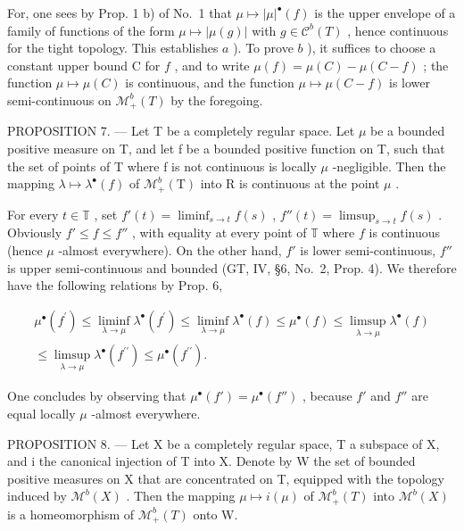 For, one sees by Prop. 1 b) of No.~1 that \(\mu \mapsto |\mu|^{\bullet}(f)\) is the upper envelope of a family of functions of the form \(\mu \mapsto |\mu(g)|\) with \(g \in \mathcal{C}^b(T)\) , hence continuous for the tight topology. This establishes \(a\) ). To prove \(b\) ), it suffices to choose a constant upper bound C for \(f\) , and to write \(\mu(f) = \mu(C) - \mu(C - f)\) ; the function \(\mu \mapsto \mu(C)\) is continuous, and the function \(\mu \mapsto \mu(C - f)\) is lower semi-continuous on \(\mathcal{M}_+^b(T)\) by the foregoing.

PROPOSITION 7. --- Let T be a completely regular space. Let \(\mu\) be a bounded positive measure on T, and let f be a bounded positive function on T, such that the set of points of T where f is not continuous is locally \(\mu\) -negligible. Then the mapping \(\lambda \mapsto \lambda^{\bullet}(f)\) of \(\mathcal{M}_{+}^{b}(\mathrm{T})\) into R is continuous at the point \(\mu\) .

For every \(t \in \mathbb{T}\) , set \(f'(t) = \liminf_{s \to t} f(s)\) , \(f''(t) = \limsup_{s \to t} f(s)\) . Obviously \(f' \leqslant f \leqslant f''\) , with equality at every point of \(\mathbb{T}\) where \(f\) is continuous (hence \(\mu\) -almost everywhere). On the other hand, \(f'\) is lower semi-continuous, \(f''\) is upper semi-continuous and bounded (GT, IV, §6, No.~2, Prop. 4). We therefore have the following relations by Prop. 6,

\[
\begin{array}{c} \mu^ {\bullet} (f ^ {\prime}) \leqslant \liminf _ {\lambda \to \mu} \lambda^ {\bullet} (f ^ {\prime}) \leqslant \liminf _ {\lambda \to \mu} \lambda^ {\bullet} (f) \leqslant \mu^ {\bullet} (f) \leqslant \limsup _ {\lambda \to \mu} \lambda^ {\bullet} (f) \\ \leqslant \limsup _ {\lambda \to \mu} \lambda^ {\bullet} (f ^ {\prime \prime}) \leqslant \mu^ {\bullet} (f ^ {\prime \prime}). \end{array}
\]

One concludes by observing that \(\mu^{\bullet}(f') = \mu^{\bullet}(f'')\) , because \(f'\) and \(f''\) are equal locally \(\mu\) -almost everywhere.

PROPOSITION 8. --- Let X be a completely regular space, T a subspace of X, and i the canonical injection of T into X. Denote by W the set of bounded positive measures on X that are concentrated on T, equipped with the topology induced by \(\mathcal{M}^{b}(X)\) . Then the mapping \(\mu \mapsto i(\mu)\) of \(\mathcal{M}_{+}^{b}(T)\) into \(\mathcal{M}^{b}(X)\) is a homeomorphism of \(\mathcal{M}_{+}^{b}(T)\) onto W.

